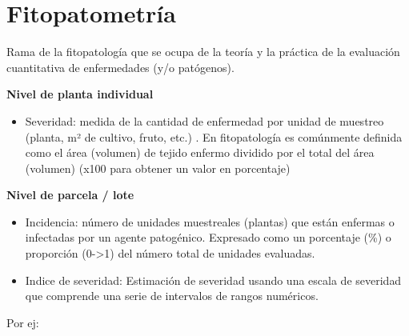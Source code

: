 \documentclass[]{book}
\title{}
\author{}
\date{}
\newenvironment{Shaded}{\begin{snugshade}}{\end{snugshade}}
\newcommand{\DecValTok}[1]{\textcolor[rgb]{0.00,0.00,0.81}{#1}}
\newcommand{\NormalTok}[1]{#1}
\newcommand{\OperatorTok}[1]{\textcolor[rgb]{0.81,0.36,0.00}{\textbf{#1}}}
\newcommand{\StringTok}[1]{\textcolor[rgb]{0.31,0.60,0.02}{#1}}
\providecommand{\tightlist}{%
  \setlength{\itemsep}{0pt}\setlength{\parskip}{0pt}}
\begin{document}
{
\setcounter{tocdepth}{1}
\tableofcontents
}
\hypertarget{fitopatometruxeda}{%
\chapter*{Fitopatometría}\label{fitopatometruxeda}}

Rama de la fitopatología que se ocupa de la teoría y la práctica de la
evaluación cuantitativa de enfermedades (y/o patógenos).

\textbf{Nivel de planta individual}

\begin{itemize}
\tightlist
\item
  Severidad: medida de la cantidad de enfermedad por unidad de muestreo
  (planta, m² de cultivo, fruto, etc.) . En fitopatología es comúnmente
  definida como el área (volumen) de tejido enfermo dividido por el
  total del área (volumen) (x100 para obtener un valor en porcentaje)
\end{itemize}

\textbf{Nivel de parcela / lote}

\begin{itemize}
\item
  Incidencia: número de unidades muestreales (plantas) que están
  enfermas o infectadas por un agente patogénico. Expresado como un
  porcentaje (\%) o proporción (0-\textgreater{}1) del número total de
  unidades evaluadas.
\item
  Indice de severidad: Estimación de severidad usando una escala de
  severidad que comprende una serie de intervalos de rangos numéricos.
\end{itemize}

Por ej:

\begin{Shaded}
\end{Shaded}
\end{document}

